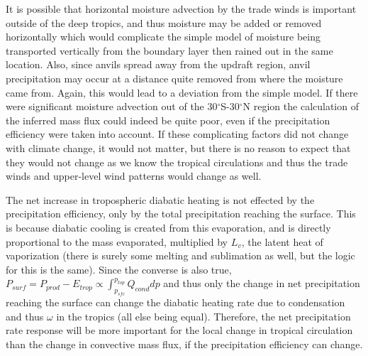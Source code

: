 \documentclass[letterpaper,12pt,titlepage,oneside,final]{book}
\begin{document}
It is possible that horizontal moisture advection by the trade winds is important outside of the deep tropics, and thus moisture may be added or removed horizontally which would complicate the simple model of moisture being transported vertically from the boundary layer then rained out in the same location. Also, since anvils spread away from the updraft region, anvil precipitation may occur at a distance quite removed from where the moisture came from. Again, this would lead to a deviation from the simple model. If there were significant moisture advection out of the 30$^{\circ}$S-30$^{\circ}$N region the calculation of the inferred mass flux could indeed be quite poor, even if the precipitation efficiency were taken into account. If these complicating factors did not change with climate change, it would not matter, but there is no reason to expect that they would not change as we know the tropical circulations and thus the trade winds and upper-level wind patterns would change as well. 

The net increase in tropospheric diabatic heating is not effected by the precipitation efficiency, only by the total precipitation reaching the surface. This is because diabatic cooling is created from this evaporation, and is directly proportional to the mass evaporated, multiplied by $L_{v}$, the latent heat of vaporization (there is surely some melting and sublimation as well, but the logic for this is the same). Since the converse is also true, $P_{surf}=P_{prod}-E_{trop} \propto \int_{p_{sfc}}^{p_{top}}Q_{cond}dp$ and thus only the change in net precipitation reaching the surface can change the diabatic heating rate due to condensation and thus $\omega$ in the tropics (all else being equal). Therefore, the net precipitation rate response will be more important for the local change in tropical circulation than the change in convective mass flux, if the precipitation efficiency can change.
\end{document}
